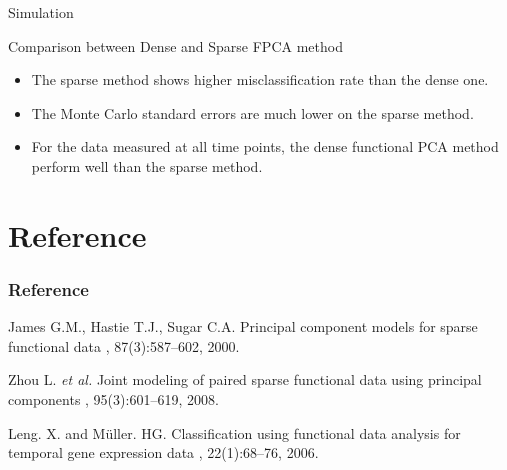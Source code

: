 \documentclass{beamer}
\begin{document}
\begin{frame}{Simulation}
	\begin{block}{Comparison between Dense and Sparse FPCA method}
		\vspace{0.1cm}
		\begin{itemize}
			\item {
				The sparse method shows higher misclassification rate than the dense one.
			}
			\item {
				The Monte Carlo standard errors are much lower on the sparse method.
			}
			\item {
				For the data measured at all time points, the dense functional PCA method perform well than the sparse method.
			}
		\end{itemize}
	\end{block}
\end{frame}



\appendix
\section{Reference}
\begin{frame}
  \frametitle<presentation>{Reference}
    
  \begin{thebibliography}{10}
  	\beamertemplatearticlebibitems
		James G.M., Hastie T.J., Sugar C.A.
		\newblock Principal component models for sparse functional data
		, 87(3):587--602,
		2000.
		
   	\beamertemplatearticlebibitems
		 Zhou L. \textit{et al.}
		 \newblock Joint modeling of paired sparse functional data using principal components
		 , 95(3):601--619,
		 2008.
    
    \beamertemplatearticlebibitems
    Leng. X. and Müller. HG.
    \newblock Classification using functional data analysis for temporal gene expression data
    , 22(1):68--76,
    2006.

  \end{thebibliography}
\end{frame}
\end{document}
